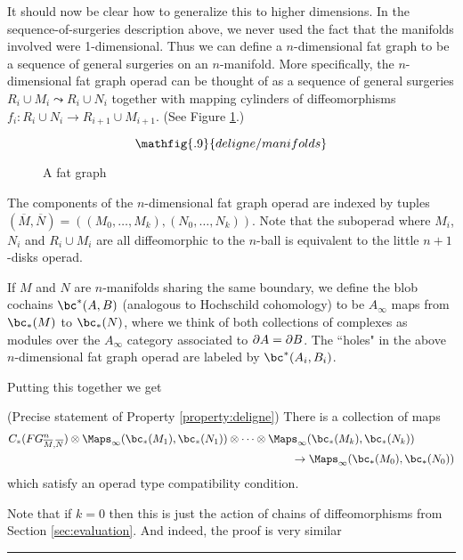 It should now be clear how to generalize this to higher dimensions.
In the sequence-of-surgeries description above, we never used the fact that the manifolds
involved were 1-dimensional.
Thus we can define a $n$-dimensional fat graph to be a sequence of general surgeries
on an $n$-manifold.
More specifically,
the $n$-dimensional fat graph operad can be thought of as a sequence of general surgeries
$R_i \cup M_i \leadsto R_i \cup N_i$ together with mapping cylinders of diffeomorphisms
$f_i: R_i\cup N_i \to R_{i+1}\cup M_{i+1}$.
(See Figure \ref{delfig2}.)
\begin{figure}[!ht]
$$\mathfig{.9}{deligne/manifolds}$$
\caption{A fat graph}\label{delfig2}\end{figure}
The components of the $n$-dimensional fat graph operad are indexed by tuples
$(\overline{M}, \overline{N}) = ((M_0,\ldots,M_k), (N_0,\ldots,N_k))$.
Note that the suboperad where $M_i$, $N_i$ and $R_i\cup M_i$ are all diffeomorphic to 
the $n$-ball is equivalent to the little $n{+}1$-disks operad.


If $M$ and $N$ are $n$-manifolds sharing the same boundary, we define
the blob cochains $\bc^*(A, B)$ (analogous to Hochschild cohomology) to be
$A_\infty$ maps from $\bc_*(M)$ to $\bc_*(N)$, where we think of both
collections of complexes as modules over the $A_\infty$ category associated to $\partial A = \partial B$.
The ``holes" in the above 
$n$-dimensional fat graph operad are labeled by $\bc^*(A_i, B_i)$.

Putting this together we get 
\begin{prop}(Precise statement of Property \ref{property:deligne})
\label{prop:deligne}
There is a collection of maps
\begin{eqnarray*}
	C_*(FG^n_{\overline{M}, \overline{N}})\otimes \mapinf(\bc_*(M_1), \bc_*(N_1))\otimes\cdots\otimes 
\mapinf(\bc_*(M_{k}), \bc_*(N_{k})) & \\
	& \hspace{-11em}\to  \mapinf(\bc_*(M_0), \bc_*(N_0))
\end{eqnarray*}
which satisfy an operad type compatibility condition. 
\end{prop}

Note that if $k=0$ then this is just the action of chains of diffeomorphisms from Section \ref{sec:evaluation}.
And indeed, the proof is very similar 



\medskip
\hrule\medskip

